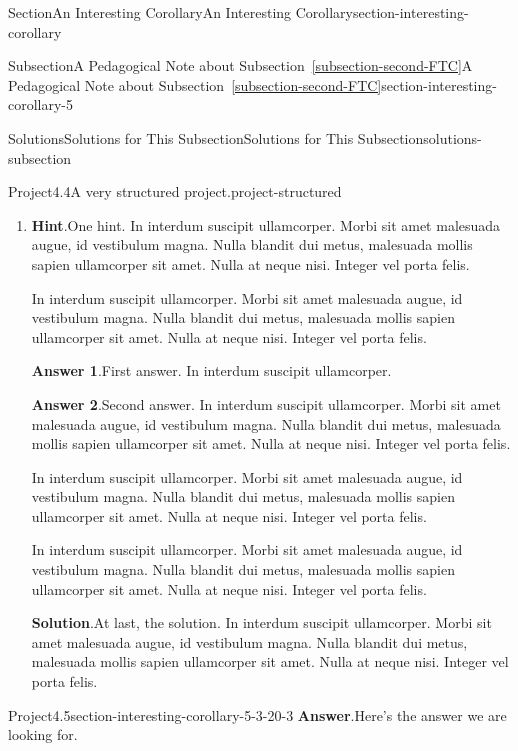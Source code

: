 \documentclass[twoside,10pt,]{article}
\newcommand{\blocktitlefont}{\relax}
\newcommand{\xreffont}{\relax}
\numberwithin{equation}{section}
\begin{document}
\begin{sectionptx}{Section}{An Interesting Corollary}{}{An Interesting Corollary}{}{}{section-interesting-corollary}
\begin{subsectionptx}{Subsection}{A Pedagogical Note about Subsection~{\xreffont\ref*{subsection-second-FTC}}}{}{A Pedagogical Note about Subsection~{\xreffont\ref*{subsection-second-FTC}}}{}{}{section-interesting-corollary-5}
\begin{solutions-subsubsection}{Solutions}{Solutions for This Subsection}{}{Solutions for This Subsection}{}{}{solutions-subsection}
\begin{projectsolution}{Project}{4.4}{A very structured project.}{project-structured}
\begin{enumerate}[font=\bfseries,label=(\alph*),ref=\alph*]
\begin{enumerate}[font=\bfseries,label=(\roman*),ref=\theenumi.\roman*]
\end{enumerate}%
\item[(d)]\noindent\textbf{\blocktitlefont Hint}.\hypertarget{project-structured-7-2-main}{}\quad{}One hint.  In interdum suscipit ullamcorper. Morbi sit amet malesuada augue, id vestibulum magna. Nulla blandit dui metus, malesuada mollis sapien ullamcorper sit amet. Nulla at neque nisi. Integer vel porta felis.%
\par
In interdum suscipit ullamcorper. Morbi sit amet malesuada augue, id vestibulum magna. Nulla blandit dui metus, malesuada mollis sapien ullamcorper sit amet. Nulla at neque nisi. Integer vel porta felis.%
\par\smallskip%
\noindent\textbf{\blocktitlefont Answer 1}.\hypertarget{project-structured-7-3-main}{}\quad{}First answer.  In interdum suscipit ullamcorper.%
\par\smallskip%
\noindent\textbf{\blocktitlefont Answer 2}.\hypertarget{project-structured-7-4-main}{}\quad{}Second answer.  In interdum suscipit ullamcorper. Morbi sit amet malesuada augue, id vestibulum magna. Nulla blandit dui metus, malesuada mollis sapien ullamcorper sit amet. Nulla at neque nisi. Integer vel porta felis.%
\par
In interdum suscipit ullamcorper. Morbi sit amet malesuada augue, id vestibulum magna. Nulla blandit dui metus, malesuada mollis sapien ullamcorper sit amet. Nulla at neque nisi. Integer vel porta felis.%
\par
In interdum suscipit ullamcorper. Morbi sit amet malesuada augue, id vestibulum magna. Nulla blandit dui metus, malesuada mollis sapien ullamcorper sit amet. Nulla at neque nisi. Integer vel porta felis.%
\par\smallskip%
\noindent\textbf{\blocktitlefont Solution}.\hypertarget{project-structured-7-5-main}{}\quad{}At last, the solution.  In interdum suscipit ullamcorper. Morbi sit amet malesuada augue, id vestibulum magna. Nulla blandit dui metus, malesuada mollis sapien ullamcorper sit amet. Nulla at neque nisi. Integer vel porta felis.%
\end{enumerate}%
\end{projectsolution}%
\begin{projectsolution}{Project}{4.5}{}{section-interesting-corollary-5-3-20-3}%
\noindent\textbf{\blocktitlefont Answer}.\hypertarget{section-interesting-corollary-5-3-20-3-2-main}{}\quad{}Here's the answer we are looking for.%
\end{projectsolution}%
\par\medskip

\end{solutions-subsubsection}
\end{subsectionptx}
\end{sectionptx}
\end{document}
